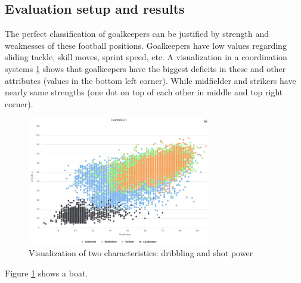 \subsection{Evaluation setup and results}
\label{sec:Evaluation}

The perfect classification of goalkeepers can be justified by strength and weaknesses of these football positions. Goalkeepers have low values regarding sliding tackle, skill moves, sprint speed, etc. A visualization in a coordination systems \ref{fig:VisualAttributes} shows that goalkeepers have the biggest deficits in these and other attributes (values in the bottom left corner). While midfielder and strikers have nearly same strengths (one dot on top of each other in middle and top right corner). 

\begin{figure}
\centering
  \includegraphics[width=8cm]{VisualizationAttributes.jpg}
  \caption{Visualization of two characteristics: dribbling and shot power}
  \label{fig:VisualAttributes}
\end{figure}

Figure \ref{fig:VisualAttributes} shows a boat.